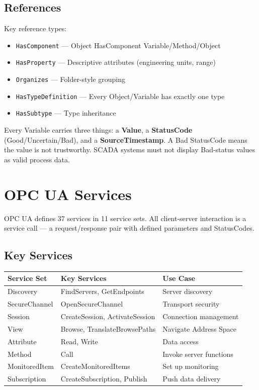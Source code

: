 \documentclass[12pt,twoside,openright]{memoir}
\begin{document}
\section{References}

Key reference types:
\begin{itemize}
  \item \texttt{HasComponent} --- Object HasComponent Variable/Method/Object
  \item \texttt{HasProperty} --- Descriptive attributes (engineering units, range)
  \item \texttt{Organizes} --- Folder-style grouping
  \item \texttt{HasTypeDefinition} --- Every Object/Variable has exactly one type
  \item \texttt{HasSubtype} --- Type inheritance
\end{itemize}

\begin{keyconcept}
Every Variable carries three things: a \textbf{Value}, a \textbf{StatusCode} (Good/Uncertain/Bad), and a
\textbf{SourceTimestamp}. A Bad StatusCode means the value is not trustworthy. SCADA systems must not display
Bad-status values as valid process data.
\end{keyconcept}

\chapter{OPC UA Services}

OPC UA defines 37 services in 11 service sets. All client-server interaction is a service call ---
a request/response pair with defined parameters and StatusCodes.

\section{Key Services}

\begin{tabularx}{\textwidth}{lXl}
\toprule
\textbf{Service Set} & \textbf{Key Services} & \textbf{Use Case} \\
\midrule
\rowcolor{rowlight} Discovery & FindServers, GetEndpoints & Server discovery \\
SecureChannel & OpenSecureChannel & Transport security \\
\rowcolor{rowlight} Session & CreateSession, ActivateSession & Connection management \\
View & Browse, TranslateBrowsePaths & Navigate Address Space \\
\rowcolor{rowlight} Attribute & Read, Write & Data access \\
Method & Call & Invoke server functions \\
\rowcolor{rowlight} MonitoredItem & CreateMonitoredItems & Set up monitoring \\
Subscription & CreateSubscription, Publish & Push data delivery \\
\bottomrule
\end{tabularx}
\end{document}
